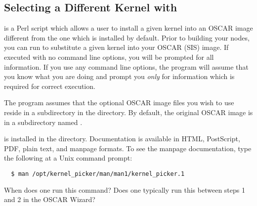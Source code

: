 
\subsection{Selecting a Different Kernel with }
\label{app:kernel-picker-overview}

 is a Perl script which allows a user to install a
given kernel into an OSCAR image different from the one which is
installed by default.  Prior to building your nodes, you can run
 to substitute a given kernel into your OSCAR
(SIS) image.  If executed with no command line options, you will be
prompted for all information.  If you use any command line options,
the program will assume that you know what you are doing and prompt
you {\em only} for information which is required for correct
execution.

The  program assumes that the optional OSCAR image
files you wish to use reside in a subdirectory in the
 directory.  By default, the
original OSCAR image is in a subdirectory named .

 is installed in the
 directory.  Documentation is available
in HTML, PostScript, PDF, plain text, and manpage formats.  To see the
manpage documentation, type the following at a Unix command prompt:

\begin{verbatim}
  $ man /opt/kernel_picker/man/man1/kernel_picker.1
\end{verbatim}

\begin{discuss}
  When does one run this command?  Does one typically run this between
  steps 1 and 2 in the OSCAR Wizard?
\end{discuss}
